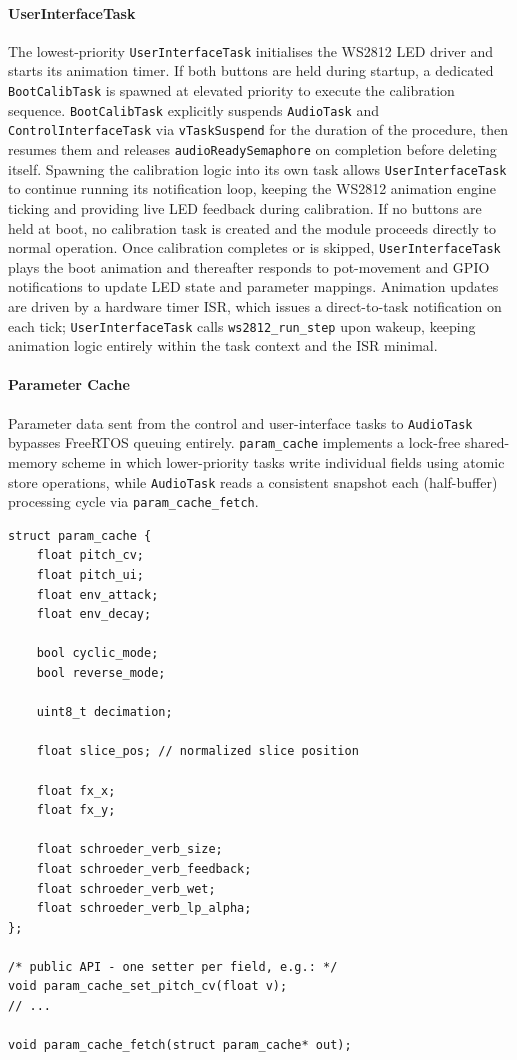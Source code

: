 \paragraph{UserInterfaceTask}
The lowest-priority \texttt{UserInterfaceTask} initialises the WS2812 LED driver and starts its animation timer.
If both buttons are held during startup, a dedicated \texttt{BootCalibTask} is spawned at elevated priority to execute the calibration sequence.
\texttt{BootCalibTask} explicitly suspends \texttt{AudioTask} and \texttt{ControlInterfaceTask} via \texttt{vTaskSuspend} for the duration of the procedure, then resumes them and releases \texttt{audioReadySemaphore} on completion before deleting itself.
Spawning the calibration logic into its own task allows \texttt{UserInterfaceTask} to continue running its notification loop, keeping the WS2812 animation engine ticking and providing live LED feedback during calibration.
If no buttons are held at boot, no calibration task is created and the module proceeds directly to normal operation.
Once calibration completes or is skipped, \texttt{UserInterfaceTask} plays the boot animation and thereafter responds to pot-movement and GPIO notifications to update LED state and parameter mappings.
Animation updates are driven by a hardware timer ISR, which issues a direct-to-task notification on each tick; \texttt{UserInterfaceTask} calls \texttt{ws2812\_run\_step} upon wakeup, keeping animation logic entirely within the task context and the ISR minimal.

\paragraph{Parameter Cache}
\label{sec:param-cache}
Parameter data sent from the control and user-interface tasks to \texttt{AudioTask}  bypasses FreeRTOS queuing entirely. 
\texttt{param\_cache} implements a lock-free shared-memory scheme in which lower-priority tasks write individual fields using atomic store operations, while \texttt{AudioTask} reads a consistent snapshot each (half-buffer) processing cycle via \texttt{param\_cache\_fetch}. 

\begin{listing}[h]
\begin{verbatim}
struct param_cache {
    float pitch_cv;
    float pitch_ui;
    float env_attack;
    float env_decay;
    
    bool cyclic_mode;
    bool reverse_mode;
    
    uint8_t decimation;
    
    float slice_pos; // normalized slice position
    
    float fx_x;
    float fx_y;
    
    float schroeder_verb_size;
    float schroeder_verb_feedback;
    float schroeder_verb_wet;
    float schroeder_verb_lp_alpha;
};

/* public API - one setter per field, e.g.: */
void param_cache_set_pitch_cv(float v);
// ...

void param_cache_fetch(struct param_cache* out);
\end{verbatim}
\caption{parameter cache API header -- all parameters controlled through shared memory}
\end{listing}


